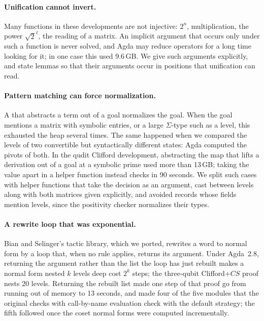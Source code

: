 \paragraph{Unification cannot invert.} Many functions in these
developments are not injective: $2^n$, multiplication, the power
$\sqrt2^\ell$, the reading of a matrix. An implicit argument that occurs
only under such a function is never solved, and Agda may reduce
operators for a long time looking for it; in one case this used
9.6\,GB. We give such arguments explicitly, and state lemmas so that
their arguments occur in positions that unification can read.

\paragraph{Pattern matching can force normalization.} A  that
abstracts a term out of a goal normalizes the goal. When the goal
mentions a matrix with symbolic entries, or a large $\Sigma$-type such
as a level, this exhausted the heap several times. The same happened
when we compared the levels of two convertible but syntactically
different states: Agda computed the pivots of both. In the qudit
Clifford development, abstracting the map that lifts a derivation out of a goal
at a symbolic prime used more than 13\,GB; taking the value apart in a
helper function instead checks in 90 seconds. We split such cases
with helper functions that take the decision as an argument, cast
between levels along  with both matrices given explicitly, and
avoided records whose fields mention levels, since the positivity
checker normalizes their types.

\paragraph{A rewrite loop that was exponential.} Bian and Selinger's
tactic library, which we ported, rewrites a word to normal form by a
loop that, when no rule applies, returns its argument. Under Agda~2.8,
returning the argument rather than the list the loop has just rebuilt
makes a normal form nested $k$ levels deep cost $2^k$ steps; the
three-qubit Clifford+$CS$ proof nests 20 levels. Returning the rebuilt
list made one step of that proof go from running out of memory to 13
seconds, and made four of the five modules that the original checks
with call-by-name evaluation check with the default strategy; the fifth
followed once the coset normal forms were computed incrementally.

